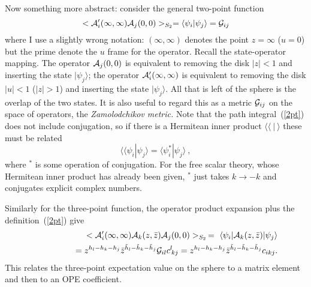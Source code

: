 Now something more abstract: consider the general two-point function
\begin{equation}
< {\cal A}'_i(\infty,\infty) {\cal A}_j(0,0) >_{S_2} =
\langle \psi_i | \psi_j\rangle = {\cal G}_{ij} \label{2pt}
\end{equation}
where I use a slightly wrong notation: $(\infty,\infty)$ denotes
the point $z = \infty$ ($u=0$) but the prime denote the $u$ frame
for the operator.
Recall the state-operator mapping.  The operator ${\cal A}_j(0,0)$
is equivalent to removing the disk $|z|<1$ and inserting the
state $| \psi_j\rangle$; the operator ${\cal A}'_i(\infty,\infty)$
is equivalent to removing the disk $|u|<1$ ($|z|>1$) and inserting the
state $| \psi_j\rangle$.  All that is left of the sphere is the overlap
of the two states.  It is also useful to regard this as a metric
${\cal G}_{ij}$ on
the space of operators, the {\it Zamolodchikov metric.}
Note that the path integral~(\ref{2pt}) does not include conjugation,
so if there is a Hermitean inner product $\langle
\!\langle \ |\ \rangle$ these must be related
\begin{equation}
\langle\!\langle \psi_i |\psi_j \rangle =
\langle \psi_i^* |\psi_j \rangle\ ,
\end{equation}
where $^*$ is some operation of conjugation.  For the free
scalar theory, whose Hermitean inner product has already been given,
$^*$ just takes $k \to -k$ and conjugates explicit complex numbers.

Similarly for the three-point function, the operator product
expansion plus the definition~(\ref{2pt}) give
\begin{eqnarray}
&&< {\cal A}'_i(\infty,\infty) 
{\cal A}_k(z,\bar z) {\cal A}_j(0,0) >_{S_2}\, =
\ \langle \psi_i | {\cal A}_k(z,\bar z) |\psi_j\rangle \nonumber\\
&&\qquad\qquad =  z^{h_l - h_k - h_j} {\bar z}^{\tilde h_l - \tilde
h_k -
\tilde h_j} {\cal G}_{il}
c^l\!_{kj} = z^{h_l - h_k - h_j} {\bar z}^{\tilde h_l - \tilde h_k -
\tilde h_j} c_{ikj} .
\label{3pt}
\end{eqnarray}
This relates the three-point expectation value on the sphere to a matrix
element and then to an OPE coefficient.

